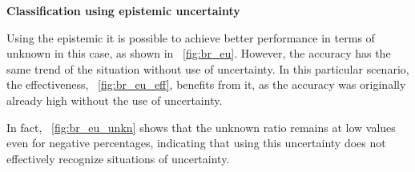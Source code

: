 \vspace{0.3cm}
\textbf{Classification using epistemic uncertainty}
\vspace{0.1cm}

Using the epistemic it is possible to achieve better performance in terms of unknown in this case, as shown in \Fig~\ref{fig:br_eu}. However, the accuracy has the same trend of the situation without use of uncertainty. In this particular scenario, the effectiveness, \Fig~\ref{fig:br_eu_eff}, benefits from it, as the accuracy was originally already high without the use of uncertainty.

In fact, \Fig~\ref{fig:br_eu_unkn} shows that the unknown ratio remains at low values even for negative percentages, indicating that using this uncertainty does not effectively recognize situations of uncertainty.


